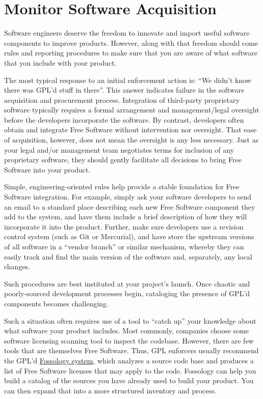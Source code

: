 \section{Monitor Software Acquisition}

Software engineers deserve the freedom to innovate and import useful
software components to improve products.  However, along with that
freedom should come rules and reporting procedures to make sure that you
are aware of what software that you include with your product.

The most typical response to an initial enforcement action is: ``We
didn't know there was GPL'd stuff in there''.  This answer indicates
failure in the software acquisition and procurement process.  Integration
of third-party proprietary software typically requires a formal
arrangement and management/legal oversight before the developers
incorporate the software.  By contrast, developers often obtain and
integrate Free Software without intervention nor oversight. That ease of acquisition, however,
does not mean the oversight is any less necessary.  Just as your legal
and/or management team negotiates terms for inclusion of any proprietary
software, they should gently facilitate all decisions to bring Free Software into your
product.

Simple, engineering-oriented rules help provide a stable foundation for
Free Software integration.  For example, simply ask your software developers to send an email to a
standard place describing each new Free Software component they add to the system,
and have them include a brief description of how they will incorporate it
into the product.  Further, make sure developers use a revision control
system (such as Git or Mercurial), and have
store the upstream versions of all software in a ``vendor branch'' or
similar mechanism, whereby they can easily track and find the main version
of the software and, separately, any local changes.

Such procedures are best instituted at your project's launch.  Once 
chaotic and poorly-sourced development processes begin, cataloging the
presence of GPL'd components  becomes challenging.

Such a situation often requires use of a tool to ``catch up'' your knowledge
about what software your product includes.  Most commonly, companies choose
some software licensing scanning tool to inspect the codebase.  However,
there are few tools that are themselves Free Software.  Thus, GPL enforcers
usually recommend the GPL'd
\href{http://fossology.org/}{Fossology system}, which analyzes a
source code base and produces a list of Free Software licenses that may apply to
the code.  Fossology can help you build a catalog of the sources you have
already used to build your product.  You can then expand that into a more
structured inventory and process.

